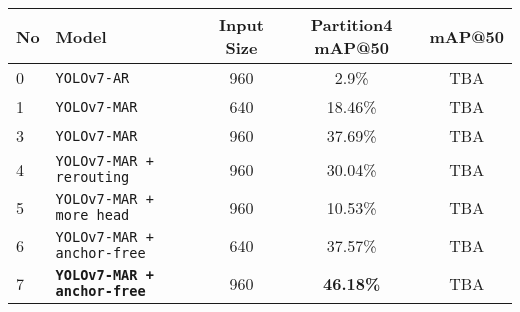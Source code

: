 \begin{tabular}{ l l c c c}
  \toprule[1.5pt]
  No & Model                                       &  Input Size  &Partition4 mAP@50               &mAP@50\\
  \midrule
  0  & \texttt{YOLOv7-AR}                          &     960      & 2.9\%                          &TBA\\
  1  & \texttt{YOLOv7-MAR}                         &     640      & 18.46\%                        &TBA\\
  3  & \texttt{YOLOv7-MAR}                         &     960      & 37.69\%                        &TBA\\
  4  & \texttt{YOLOv7-MAR + rerouting}             &     960      & 30.04\%                        &TBA\\
  5  & \texttt{YOLOv7-MAR + more head}             &     960      & 10.53\%                        &TBA\\
  6  & \texttt{YOLOv7-MAR + anchor-free}           &     640      & 37.57\%                        &TBA\\
  7  & \texttt{\textbf{YOLOv7-MAR + anchor-free}}  &     960      &\textbf{46.18\%}                &TBA\\
  \bottomrule[1.5pt]
\end{tabular}